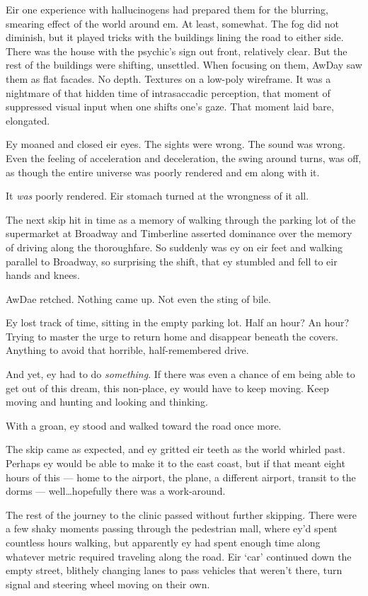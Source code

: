 Eir one experience with hallucinogens had prepared them for the blurring, smearing effect of the world around em. At least, somewhat. The fog did not diminish, but it played tricks with the buildings lining the road to either side. There was the house with the psychic's sign out front, relatively clear. But the rest of the buildings were shifting, unsettled. When focusing on them, AwDay saw them as flat facades. No depth. Textures on a low-poly wireframe. It was a nightmare of that hidden time of intrasaccadic perception, that moment of suppressed visual input when one shifts one's gaze. That moment laid bare, elongated.

Ey moaned and closed eir eyes. The sights were wrong. The sound was wrong. Even the feeling of acceleration and deceleration, the swing around turns, was off, as though the entire universe was poorly rendered and em along with it.

It \emph{was} poorly rendered. Eir stomach turned at the wrongness of it all.

The next skip hit in time as a memory of walking through the parking lot of the supermarket at Broadway and Timberline asserted dominance over the memory of driving along the thoroughfare. So suddenly was ey on eir feet and walking parallel to Broadway, so surprising the shift, that ey stumbled and fell to eir hands and knees.

AwDae retched. Nothing came up. Not even the sting of bile.

Ey lost track of time, sitting in the empty parking lot. Half an hour? An hour? Trying to master the urge to return home and disappear beneath the covers. Anything to avoid that horrible, half-remembered drive.

And yet, ey had to do \emph{something}. If there was even a chance of em being able to get out of this dream, this non-place, ey would have to keep moving. Keep moving and hunting and looking and thinking.

With a groan, ey stood and walked toward the road once more.

The skip came as expected, and ey gritted eir teeth as the world whirled past. Perhaps ey would be able to make it to the east coast, but if that meant eight hours of this — home to the airport, the plane, a different airport, transit to the dorms — well\ldots{}hopefully there was a work-around.

The rest of the journey to the clinic passed without further skipping. There were a few shaky moments passing through the pedestrian mall, where ey'd spent countless hours walking, but apparently ey had spent enough time along whatever metric required traveling along the road. Eir `car' continued down the empty street, blithely changing lanes to pass vehicles that weren't there, turn signal and steering wheel moving on their own.

